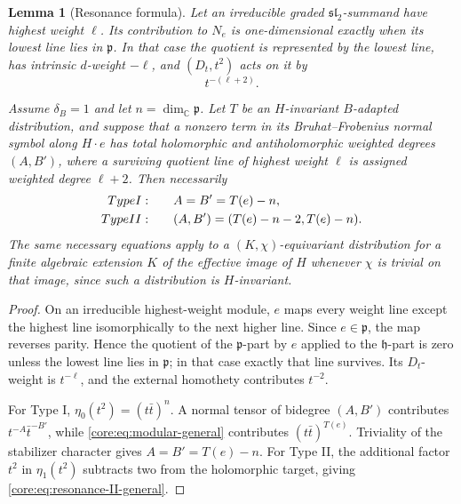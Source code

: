 \documentclass[10pt,a4paper]{amsart}
\numberwithin{equation}{section}
\newtheorem{lemma}[theorem]{Lemma}
\newcommand{\C}{\mathbb C}
\newcommand{\fh}{\mathfrak h}
\newcommand{\fp}{\mathfrak p}
\begin{document}
\begin{lemma}[Resonance formula]\label{core:lem:resonance-general}
Let an irreducible graded $\mathfrak{sl}_2$-summand have highest weight
$\ell$.  Its contribution to $N_e$ is one-dimensional exactly when its lowest
line lies in $\fp$.  In that case the quotient is represented by the lowest
line, has intrinsic $d$-weight $-\ell$, and $(D_t,t^2)$ acts on it by
\begin{equation}\label{core:eq:elementary-degree-general}
 t^{-(\ell+2)}.
\end{equation}

Assume $\delta_B=1$ and let $n=\dim_{\C}\fp$.  Let $T$ be an
$H$-invariant $B$-adapted distribution, and suppose that a nonzero term in its
Bruhat--Frobenius normal symbol along $H\cdot e$ has total holomorphic and
antiholomorphic weighted degrees $(A,B')$, where a surviving quotient line of
highest weight $\ell$ is assigned weighted degree $\ell+2$.  Then necessarily
\begin{align}
 \textup{Type I:}&\qquad A=B'=T(e)-n,\label{core:eq:resonance-I-general}\\
 \textup{Type II:}&\qquad (A,B')=(T(e)-n-2,T(e)-n).
 \label{core:eq:resonance-II-general}
\end{align}
The same necessary equations apply to a $(K,\chi)$-equivariant distribution
for a finite algebraic extension $K$ of the effective image of $H$ whenever
$\chi$ is trivial on that image, since such a distribution is $H$-invariant.
\end{lemma}

\begin{proof}
On an irreducible highest-weight module, $e$ maps every weight line except the
highest line isomorphically to the next higher line.  Since $e\in\fp$, the map
reverses parity.  Hence the quotient of the $\fp$-part by $e$ applied to the
$\fh$-part is zero unless the lowest line lies in $\fp$; in that case exactly
that line survives.  Its $D_t$-weight is $t^{-\ell}$, and the external
homothety contributes $t^{-2}$.

For Type I,
$\eta_0(t^2)=(t\bar t)^n$.  A normal tensor of bidegree $(A,B')$ contributes
$t^{-A}\bar t^{-B'}$, while \eqref{core:eq:modular-general} contributes
$(t\bar t)^{T(e)}$.  Triviality of the stabilizer character gives
$A=B'=T(e)-n$.  For Type II, the additional factor $t^2$ in
$\eta_1(t^2)$ subtracts two from the holomorphic target, giving
\eqref{core:eq:resonance-II-general}.
\end{proof}
\end{document}
